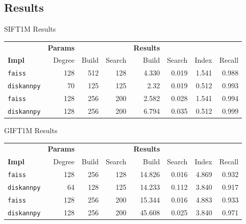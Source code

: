 
\subsection{Results}

\begin{frame}{SIFT1M Results}
    \begin{table}[ht]
        \begin{tabular}{l|rrr|rrrr}
            \toprule
            & \textbf{Params} & & & \textbf{Results} & & \\
            \textbf{Impl} & Degree & Build & Search & Build & Search & Index & Recall \\
            \midrule
            \texttt{faiss} & 128 & 512 & 128 & 4.330 & 0.019 & 1.541 & 0.988 \\
            \texttt{diskannpy} & 70 & 125 & 125 & 2.32 & 0.019 & 0.512 & 0.993 \\
            \midrule
            \texttt{faiss} & 128 & 256 & 200 & 2.582 & 0.028 & 1.541 & 0.994  \\
            \texttt{diskannpy} & 128 & 256 & 200 & 6.794 & 0.035 & 0.512 & 0.999 \\
            \bottomrule
        \end{tabular}
    \end{table}
\end{frame}

\begin{frame}{GIFT1M Results}
    \begin{table}[ht]
        \begin{tabular}{l|rrr|rrrr}
            \toprule
            & \textbf{Params} & & & \textbf{Results} & & \\
            \textbf{Impl} & Degree & Build & Search & Build & Search & Index & Recall \\
            \midrule
            \texttt{faiss} & 128 & 256 & 128 & 14.826 & 0.016 & 4.869 & 0.932 \\
            \texttt{diskannpy} & 64 & 128 & 125 & 14.233 & 0.112 & 3.840 & 0.917 \\
            \midrule
            \texttt{faiss} & 128 & 256 & 200 & 15.344 & 0.016 & 4.883 & 0.933 \\
            \texttt{diskannpy} & 128 & 256 & 200 & 45.608 & 0.025 & 3.840 & 0.971 \\
            \bottomrule
        \end{tabular}
    \end{table}
\end{frame}

